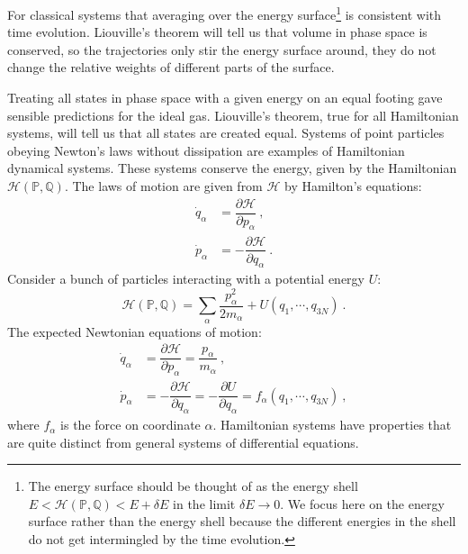 \documentclass[12pt,a4paper]{article}
\newcounter{theo}[section]\setcounter{theo}{0}
\begin{document}
\cite{thorne2017modern} 



\cite{sethna2006statistical} For classical systems that averaging over the energy surface\footnote{The energy surface should be thought
of as the energy shell $E < \mathcal H(\mathbb P, \mathbb Q) < E + \delta E$ in the limit $\delta E \rightarrow 0$. We focus here on the energy surface rather than the energy shell because the different energies in the shell do not get intermingled by the time evolution.} is consistent with time evolution. Liouville's theorem will tell us that volume in phase space is conserved, so the trajectories only stir the energy surface around, they do not change the relative weights of different parts of the surface.

Treating all states in phase space with a given energy on an equal footing gave sensible predictions for the ideal gas. Liouville's theorem, true for all Hamiltonian systems, will tell us that all states are created equal. Systems of point particles obeying Newton's laws without dissipation are examples of Hamiltonian dynamical systems. These systems conserve the energy, given by the Hamiltonian $\mathcal H(\mathbb P, \mathbb Q)$. The laws of motion are given from $\mathcal H$ by Hamilton's equations:
\begin{align}
\dot{q}_\alpha &= \dfrac{\partial \mathcal H}{\partial p_\alpha} ~, \\
\dot{p}_\alpha &= -\dfrac{\partial \mathcal H}{\partial q_\alpha} ~.
\end{align}
Consider a bunch of particles interacting with a potential energy $U$:
\begin{equation}
\mathcal H(\mathbb P, \mathbb Q) = \sum_\alpha \dfrac{p_\alpha^2}{2m_\alpha} + U(q_1, \cdots, q_{3N}) ~.
\end{equation}
The expected Newtonian equations of motion:
\begin{align}
\dot{q}_\alpha &= \dfrac{\partial \mathcal H}{\partial p_\alpha} = \dfrac{p_\alpha}{m_\alpha} ~, \\
\dot{p}_\alpha &= -\dfrac{\partial \mathcal H}{\partial q_\alpha} = -\dfrac{\partial U}{\partial q_\alpha} = f_\alpha(q_1, \cdots, q_{3N}) ~,
\end{align}
where $f_\alpha$ is the force on coordinate $\alpha$. Hamiltonian systems have properties that are quite distinct from general systems of differential equations.
\end{document}
